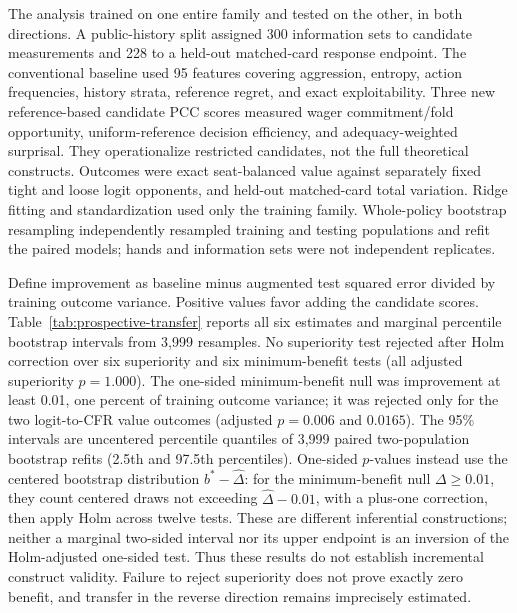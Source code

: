 \documentclass[journal]{IEEEtran}
\begin{document}
The analysis trained on one entire family and tested on the other, in both directions. A public-history split assigned 300 information sets to candidate measurements and 228 to a held-out matched-card response endpoint. The conventional baseline used 95 features covering aggression, entropy, action frequencies, history strata, reference regret, and exact exploitability. Three new reference-based candidate PCC scores measured wager commitment/fold opportunity, uniform-reference decision efficiency, and adequacy-weighted surprisal. They operationalize restricted candidates, not the full theoretical constructs. Outcomes were exact seat-balanced value against separately fixed tight and loose logit opponents, and held-out matched-card total variation. Ridge fitting and standardization used only the training family. Whole-policy bootstrap resampling independently resampled training and testing populations and refit the paired models; hands and information sets were not independent replicates.

Define improvement as baseline minus augmented test squared error divided by training outcome variance. Positive values favor adding the candidate scores. Table~\ref{tab:prospective-transfer} reports all six estimates and marginal percentile bootstrap intervals from 3,999 resamples. No superiority test rejected after Holm correction over six superiority and six minimum-benefit tests (all adjusted superiority $p=1.000$). The one-sided minimum-benefit null was improvement at least 0.01, one percent of training outcome variance; it was rejected only for the two logit-to-CFR value outcomes (adjusted $p=0.006$ and $0.0165$). The 95\% intervals are uncentered percentile quantiles of 3,999 paired two-population bootstrap refits (2.5th and 97.5th percentiles). One-sided $p$-values instead use the centered bootstrap distribution $b^*-\hat\Delta$: for the minimum-benefit null $\Delta\geq0.01$, they count centered draws not exceeding $\hat\Delta-0.01$, with a plus-one correction, then apply Holm across twelve tests. These are different inferential constructions; neither a marginal two-sided interval nor its upper endpoint is an inversion of the Holm-adjusted one-sided test. Thus these results do not establish incremental construct validity. Failure to reject superiority does not prove exactly zero benefit, and transfer in the reverse direction remains imprecisely estimated.
\end{document}
